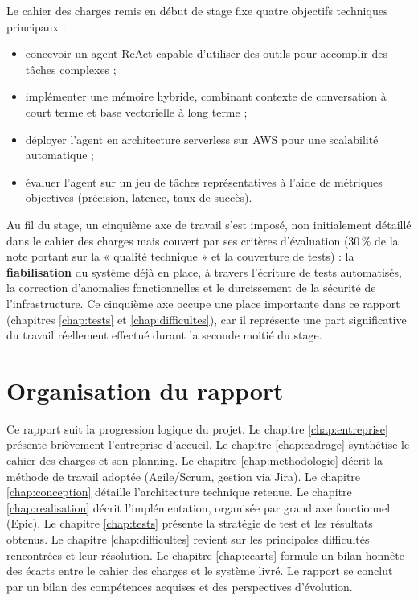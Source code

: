 \documentclass[11pt,a4paper]{report}
\begin{document}
Le cahier des charges remis en début de stage fixe quatre objectifs
techniques principaux :
\begin{itemize}[nosep]
    \item concevoir un agent ReAct capable d'utiliser des outils pour
    accomplir des tâches complexes ;
    \item implémenter une mémoire hybride, combinant contexte de
    conversation à court terme et base vectorielle à long terme ;
    \item déployer l'agent en architecture serverless sur AWS pour une
    scalabilité automatique ;
    \item évaluer l'agent sur un jeu de tâches représentatives à l'aide
    de métriques objectives (précision, latence, taux de succès).
\end{itemize}

Au fil du stage, un cinquième axe de travail s'est imposé, non
initialement détaillé dans le cahier des charges mais couvert par ses
critères d'évaluation (30\,\% de la note portant sur la « qualité
technique » et la couverture de tests) : la \textbf{fiabilisation} du
système déjà en place, à travers l'écriture de tests automatisés, la
correction d'anomalies fonctionnelles et le durcissement de la
sécurité de l'infrastructure. Ce cinquième axe occupe une place
importante dans ce rapport (chapitres \ref{chap:tests} et
\ref{chap:difficultes}), car il représente une part significative du
travail réellement effectué durant la seconde moitié du stage.

\section{Organisation du rapport}

Ce rapport suit la progression logique du projet. Le chapitre
\ref{chap:entreprise} présente brièvement l'entreprise d'accueil. Le
chapitre \ref{chap:cadrage} synthétise le cahier des charges et son
planning. Le chapitre \ref{chap:methodologie} décrit la méthode de
travail adoptée (Agile/Scrum, gestion via Jira). Le chapitre
\ref{chap:conception} détaille l'architecture technique retenue. Le
chapitre \ref{chap:realisation} décrit l'implémentation, organisée par
grand axe fonctionnel (Epic). Le chapitre \ref{chap:tests} présente la
stratégie de test et les résultats obtenus. Le chapitre
\ref{chap:difficultes} revient sur les principales difficultés
rencontrées et leur résolution. Le chapitre \ref{chap:ecarts} formule
un bilan honnête des écarts entre le cahier des charges et le système
livré. Le rapport se conclut par un bilan des compétences acquises et
des perspectives d'évolution.
\end{document}
